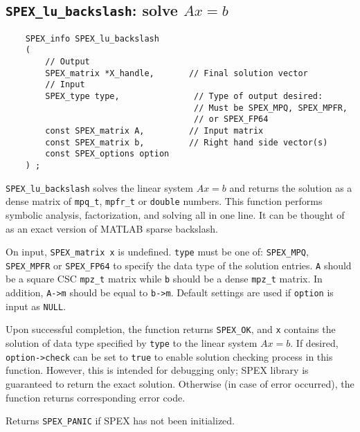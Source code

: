 \documentclass[12pt]{report}
\theoremstyle{definition}
\begin{document}
\cprotect\subsection{\verb|SPEX_lu_backslash|: solve $Ax=b$}
\label{ss:SPEX_lu_backslash}

\begin{mdframed}[userdefinedwidth=6in]
{\footnotesize
\begin{verbatim}
    SPEX_info SPEX_lu_backslash
    (
        // Output
        SPEX_matrix *X_handle,       // Final solution vector
        // Input
        SPEX_type type,               // Type of output desired:
                                      // Must be SPEX_MPQ, SPEX_MPFR,
                                      // or SPEX_FP64
        const SPEX_matrix A,         // Input matrix
        const SPEX_matrix b,         // Right hand side vector(s)
        const SPEX_options option
    ) ;
\end{verbatim}
} \end{mdframed}

\verb|SPEX_lu_backslash| solves the linear system $Ax=b$ and returns the solution
as a dense matrix of \verb|mpq_t|, \verb|mpfr_t| or \verb|double| numbers. This
function performs symbolic analysis, factorization, and solving all in one line. 
It can be thought of as an exact version of MATLAB sparse backslash.

On input, \verb|SPEX_matrix x| is undefined. \verb|type| must be one of:
\verb|SPEX_MPQ|, \verb|SPEX_MPFR| or \verb|SPEX_FP64| to specify the data type
of the solution entries. \verb|A| should be a square CSC \verb|mpz_t| matrix
while \verb|b| should be a dense \verb|mpz_t| matrix. In addition, \verb|A->m|
should be equal to \verb|b->m|.  Default settings are used if
\verb|option| is input as \verb|NULL|.

Upon successful completion, the function returns \verb|SPEX_OK|, and
\verb|x| contains the solution of data type specified by
\verb|type| to the linear system $Ax=b$. If desired, \verb|option->check| can
be set to \verb|true| to enable solution checking process in this function.
However, this is intended for debugging only; SPEX library is guaranteed to
return the exact solution. Otherwise (in case of error occurred), the function
returns corresponding error code.

Returns \verb|SPEX_PANIC| if SPEX has not been initialized.
\end{document}
